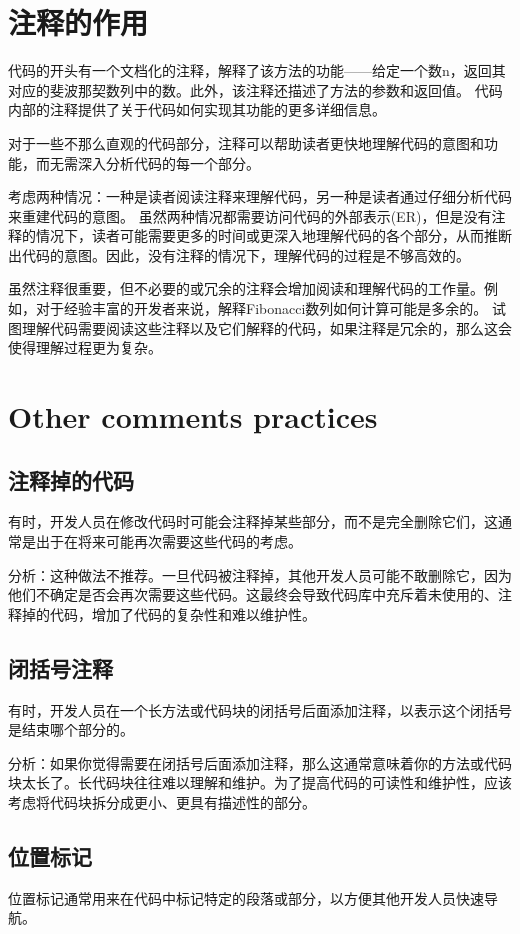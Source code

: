\section{注释的作用}
代码的开头有一个文档化的注释，解释了该方法的功能——给定一个数n，返回其对应的斐波那契数列中的数。此外，该注释还描述了方法的参数和返回值。
代码内部的注释提供了关于代码如何实现其功能的更多详细信息。

对于一些不那么直观的代码部分，注释可以帮助读者更快地理解代码的意图和功能，而无需深入分析代码的每一个部分。

考虑两种情况：一种是读者阅读注释来理解代码，另一种是读者通过仔细分析代码来重建代码的意图。
虽然两种情况都需要访问代码的外部表示(ER)，但是没有注释的情况下，读者可能需要更多的时间或更深入地理解代码的各个部分，从而推断出代码的意图。因此，没有注释的情况下，理解代码的过程是不够高效的。

虽然注释很重要，但不必要的或冗余的注释会增加阅读和理解代码的工作量。例如，对于经验丰富的开发者来说，解释Fibonacci数列如何计算可能是多余的。
试图理解代码需要阅读这些注释以及它们解释的代码，如果注释是冗余的，那么这会使得理解过程更为复杂。

\section{Other comments practices}
\subsection{注释掉的代码}
有时，开发人员在修改代码时可能会注释掉某些部分，而不是完全删除它们，这通常是出于在将来可能再次需要这些代码的考虑。

分析：这种做法不推荐。一旦代码被注释掉，其他开发人员可能不敢删除它，因为他们不确定是否会再次需要这些代码。这最终会导致代码库中充斥着未使用的、注释掉的代码，增加了代码的复杂性和难以维护性。

\subsection{闭括号注释}
有时，开发人员在一个长方法或代码块的闭括号后面添加注释，以表示这个闭括号是结束哪个部分的。

分析：如果你觉得需要在闭括号后面添加注释，那么这通常意味着你的方法或代码块太长了。长代码块往往难以理解和维护。为了提高代码的可读性和维护性，应该考虑将代码块拆分成更小、更具有描述性的部分。
\subsection{位置标记}
位置标记通常用来在代码中标记特定的段落或部分，以方便其他开发人员快速导航。

